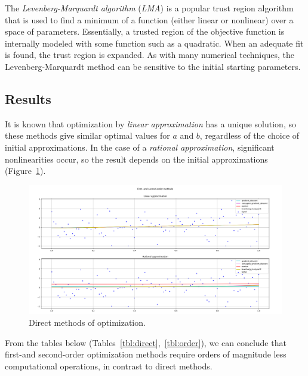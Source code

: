 The \textit{Levenberg-Marquardt algorithm} (\textit{LMA}) is a popular trust region algorithm that is used to find a minimum of a function (either linear or nonlinear) over a space of parameters.
Essentially, a trusted region of the objective function is internally modeled with some function such as a quadratic.
When an adequate fit is found, the trust region is expanded.
As with many numerical techniques, the Levenberg-Marquardt method can be sensitive to the initial starting parameters.

\subsection{Results}\label{subsec:results}

It is known that optimization by \textit{linear approximation} has a unique solution, so these methods give similar optimal values for $a$ and $b$, regardless of the choice of initial approximations.
In the case of a \textit{rational approximation}, significant nonlinearities occur, so the result depends on the initial approximations (Figure~\ref{ris:plot}).

\begin{figure}[H]
    \center
    \includegraphics[width=\textwidth]{img/plot.png}
    \caption{Direct methods of optimization.}
    \label{ris:plot}
\end{figure}

From the tables below (Tables~\ref{tbl:direct},~\ref{tbl:order}), we can conclude that first-and second-order optimization methods require orders of magnitude less computational operations, in contrast to direct methods.

